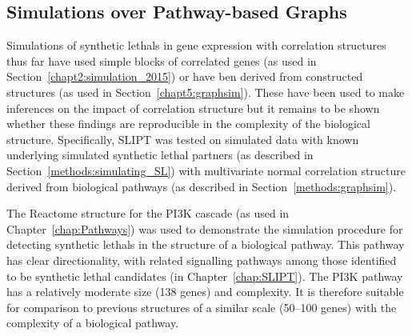 

\subsection{Simulations over Pathway-based Graphs}

\FloatBarrier

Simulations of \glspl{synthetic lethal} in \gls{gene expression} with correlation structures thus far have used simple blocks of correlated genes (as used in Section~\ref{chapt2:simulation_2015}) or have ben derived from constructed  structures (as used in Section~\ref{chapt5:graphsim}). These have been used to make inferences on the impact of correlation structure but it remains to be shown whether these findings are reproducible in the complexity of the biological  structure. Specifically, \gls{SLIPT} was tested on simulated data with known underlying simulated \gls{synthetic lethal} partners (as described in Section~\ref{methods:simulating_SL}) with multivariate normal correlation structure derived from biological pathways (as described in Section~\ref{methods:graphsim}).

The Reactome  structure for the PI3K cascade (as used in Chapter~\ref{chap:Pathways}) was used to demonstrate the simulation procedure for detecting \glspl{synthetic lethal} in the  structure of a biological pathway. This pathway has clear directionality, with related signalling pathways among those identified to be \gls{synthetic lethal} candidates (in Chapter~\ref{chap:SLIPT}). The PI3K pathway has a relatively moderate size (138 genes) and complexity. It is therefore suitable for comparison to previous  structures of a similar scale (50--100 genes) with the complexity of a biological pathway.

